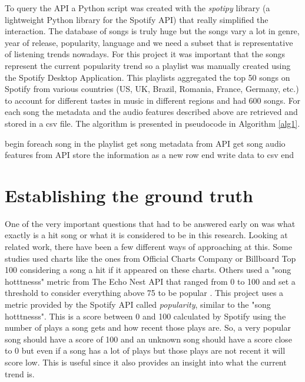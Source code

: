 To query the API a Python script was created with the \textit{spotipy} library \cite{Spotipy:online} (a lightweight Python library for the Spotify API) that really simplified the interaction. The database of songs is truly huge but the songs vary a lot in genre, year of release, popularity, language and we need a subset that is representative of listening trends nowadays. For this project it was important that the songs represent the current popularity trend so a playlist was manually created using the Spotify Desktop Application. This playlists aggregated the top 50 songs on Spotify from various countries (US, UK, Brazil, Romania, France, Germany, etc.) to account for different tastes in music in different regions and had 600 songs. For each song the metadata and the audio features described above are retrieved and stored in a csv file. The algorithm is presented in pseudocode in Algorithm \ref{alg1}.
\begin{algorithm}[caption={"Getting the data"}, label={alg1}]
begin
    foreach song in the playlist
        get song metadata from API
        get song audio features from API
        store the information as a new row
    end
    write data to csv
end
    
\end{algorithm}

\section{Establishing the ground truth}
\label{ground_truth}
One of the very important questions that had to be answered early on was what exactly is a hit song or what it is considered to be in this research. Looking at related work, there have been a few different ways of approaching at this. Some studies used charts like the ones from Official Charts Company \cite{herremans2014dance} or Billboard Top 100 \cite{reiman2018predicting} considering a song a hit if it appeared on these charts. Others used a "song hotttnesss" metric from The Echo Nest API that ranged from 0 to 100 and set a threshold to consider everything above 75 to be popular \cite{pham2016predicting}. This project uses a metric provided by the Spotify API called \textit{popularity}, similar to the "song hotttnesss". This is a score between 0 and 100 calculated by Spotify using the number of plays a song gets and how recent those plays are. So, a very popular song should have a score of 100 and an unknown song should have a score close to 0 but even if a song has a lot of plays but those plays are not recent it will score low. This is useful since it also provides an insight into what the current trend is.

